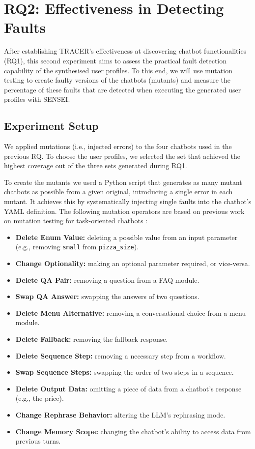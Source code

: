 \section{RQ2: Effectiveness in Detecting Faults}

After establishing \ac{TRACER}'s effectiveness at
discovering chatbot functionalities (RQ1),
this second experiment aims to assess
the practical fault detection capability
of the synthesised user profiles.
To this end, we will use mutation testing
\autocite{demilloHintsTestData1978}
to create faulty versions of the chatbots (mutants)
and measure the percentage of these faults
that are detected when executing the generated user profiles with SENSEI.

\subsection{Experiment Setup}

We applied mutations (i.e., injected errors)
to the four chatbots used in the previous RQ.
To choose the user profiles,
we selected the set that achieved the highest coverage
out of the three sets generated during RQ1.

To create the mutants we used a Python script
that generates as many mutant chatbots as possible from a given original,
introducing a single error in each mutant.
It achieves this by systematically injecting
single faults into the chatbot's YAML definition.
The following mutation operators are based on previous work
on mutation testing for task-oriented chatbots
\autocite{gomez-abajoMutationTestingTaskOriented2024, urricoMutaBotMutationTesting2024}:

\begin{itemize}
  \item \textbf{Delete Enum Value:}
    deleting a possible value from an input parameter
    (e.g., removing \texttt{small} from \texttt{pizza\_size}).
  \item \textbf{Change Optionality:}
    making an optional parameter required, or vice-versa.
  \item \textbf{Delete QA Pair:}
    removing a question from a FAQ module.
  \item \textbf{Swap QA Answer:}
    swapping the answers of two questions.
  \item \textbf{Delete Menu Alternative:}
    removing a conversational choice from a menu module.
  \item \textbf{Delete Fallback:}
    removing the fallback response.
  \item \textbf{Delete Sequence Step:}
    removing a necessary step from a workflow.
  \item \textbf{Swap Sequence Steps:}
    swapping the order of two steps in a sequence.
  \item \textbf{Delete Output Data:}
    omitting a piece of data from a chatbot's response (e.g., the price).
  \item \textbf{Change Rephrase Behavior:}
    altering the LLM's rephrasing mode.
  \item \textbf{Change Memory Scope:}
    changing the chatbot's ability to access data from previous turns.
\end{itemize}

